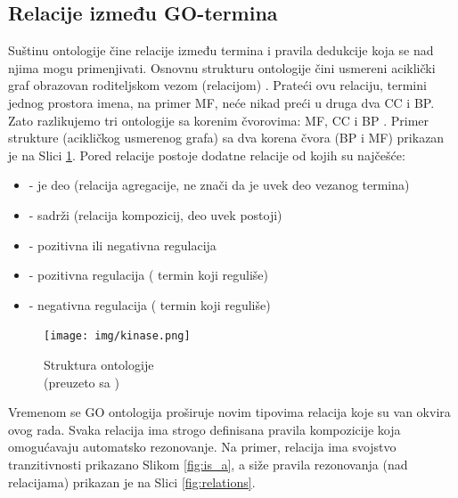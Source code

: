 \subsection{Relacije između GO-termina}

Suštinu ontologije čine relacije između termina i pravila dedukcije koja se nad
njima mogu primenjivati. Osnovnu strukturu ontologije čini usmereni aciklički
graf  obrazovan roditeljskom vezom (relacijom) . Prateći
ovu relaciju, termini jednog prostora imena, na primer MF, neće nikad preći u
druga dva CC i BP. Zato razlikujemo tri ontologije sa korenim čvorovima:  MF, CC i BP
\parencite{go_struktura}. Primer strukture (acikličkog usmerenog grafa) sa dva
korena čvora (BP i MF) prikazan je na Slici \ref{fig:kinase}.  Pored relacije
 postoje dodatne relacije od kojih su najčešće:

\begin{itemize}
  \item {}  - je deo  (relacija agregacije, ne znači da je uvek deo vezanog termina)
  \item {} - sadrži (relacija kompozicij, deo uvek postoji)
  \item {} - pozitivna ili negativna regulacija
  \item {} - pozitivna regulacija  
    ( termin koji reguliše)
  \item {} - negativna regulacija 
    ( termin koji reguliše)
\end{itemize}

\begin{figure}[h!]
  \centering
  \texttt{[image: img/kinase.png]}
  \caption{Struktura ontologije\\ \footnotesize (preuzeto sa \parencite{go_veb})}
  \label{fig:kinase}
\end{figure}

Vremenom se GO ontologija proširuje novim tipovima relacija koje su van okvira
ovog rada.  Svaka relacija ima strogo definisana pravila kompozicije koja
omogućavaju automatsko rezonovanje. Na primer, relacija 
ima svojstvo tranzitivnosti \parencite{is_a} prikazano Slikom \ref{fig:is_a}, a
siže pravila rezonovanja (nad relacijama) prikazan je na Slici
\ref{fig:relations}.

\lstset{
  basicstyle=\ttfamily, mathescape,
  numbers=none
}


